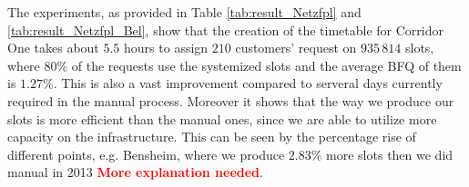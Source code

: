The experiments, as provided in Table \ref{tab:result_Netzfpl} and \ref{tab:result_Netzfpl_Bel}, show that the creation of the timetable for Corridor One takes about $5.5$ hours to assign $210$ customers' request on $935\,814$ slots, where $80\%$ of the requests use the systemized slots and the average BFQ of them is $1.27\%$. This is also a vast improvement compared to serveral days currently required in the manual process. Moreover it shows that the way we produce our slots is more efficient than the manual ones, since we are able to utilize more capacity on the infrastructure. This can be seen by the percentage rise of different points, e.g. Bensheim, where we produce $2.83\%$ more slots then we did manual in 2013 \textbf{\textcolor{red}{More explanation needed}}.